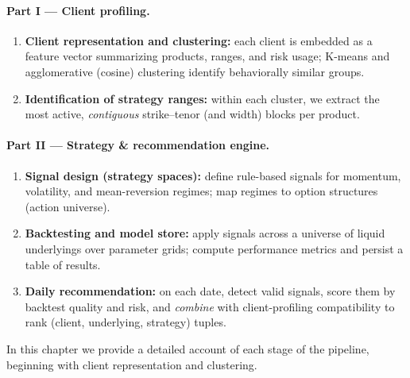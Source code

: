 \documentclass[12pt,a4paper]{report}
\begin{document}
\paragraph{Part I — Client profiling.}
\begin{enumerate}
    \item \textbf{Client representation and clustering:} each client is embedded as a feature vector summarizing products, ranges, and risk usage; K-means and agglomerative (cosine) clustering identify behaviorally similar groups.
    \item \textbf{Identification of strategy ranges:} within each cluster, we extract the most active, \emph{contiguous} strike–tenor (and width) blocks per product.
\end{enumerate}

\paragraph{Part II — Strategy \& recommendation engine.}
\begin{enumerate}
    \item \textbf{Signal design (strategy spaces):} define rule-based signals for momentum, volatility, and mean-reversion regimes; map regimes to option structures (action universe).
    \item \textbf{Backtesting and model store:} apply signals across a universe of liquid underlyings over parameter grids; compute performance metrics and persist a table of results.
    \item \textbf{Daily recommendation:} on each date, detect valid signals, score them by backtest quality and risk, and \emph{combine} with client-profiling compatibility to rank (client, underlying, strategy) tuples.
\end{enumerate}

In this chapter we provide a detailed account of each stage of the pipeline, beginning with client representation and clustering.
\end{document}
